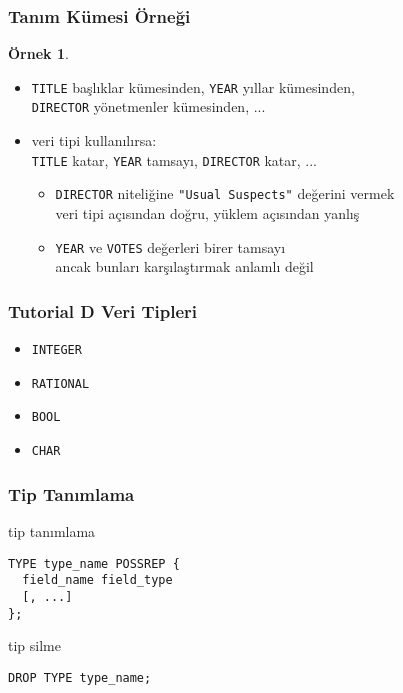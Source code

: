 \documentclass[dvipsnames]{beamer}
\theoremstyle{definition}
\theoremstyle{example}
\newtheorem{ornek}[theorem]{Örnek}
\theoremstyle{plain}
\begin{document}
\begin{frame}
  \frametitle{Tanım Kümesi Örneği}

  \begin{ornek}
    \begin{itemize}
      \item \texttt{TITLE} başlıklar kümesinden, \texttt{YEAR} yıllar
        kümesinden,\\
        \texttt{DIRECTOR} yönetmenler kümesinden, ...

      \pause
      \item veri tipi kullanılırsa:\\
        \texttt{TITLE} katar, \texttt{YEAR} tamsayı, \texttt{DIRECTOR} katar,
          ...

      \begin{itemize}
        \item \texttt{DIRECTOR} niteliğine \texttt{"Usual Suspects"} değerini
          vermek\\
          veri tipi açısından doğru, yüklem açısından yanlış

        \item \texttt{YEAR} ve \texttt{VOTES} değerleri birer tamsayı\\
          ancak bunları karşılaştırmak anlamlı değil
      \end{itemize}
    \end{itemize}
  \end{ornek}
\end{frame}

\begin{frame}
  \frametitle{Tutorial D Veri Tipleri}

  \begin{itemize}
    \item \texttt{INTEGER}
    \item \texttt{RATIONAL}
    \item \texttt{BOOL}
    \item \texttt{CHAR}
  \end{itemize}
\end{frame}

\begin{frame}[fragile]
  \frametitle{Tip Tanımlama}

  \begin{block}{tip tanımlama}
    \begin{lstlisting}
TYPE type_name POSSREP {
  field_name field_type
  [, ...]
};
    \end{lstlisting}
  \end{block}

  \pause
  \begin{block}{tip silme}
    \begin{lstlisting}
DROP TYPE type_name;
    \end{lstlisting}
  \end{block}
\end{frame}
\end{document}
